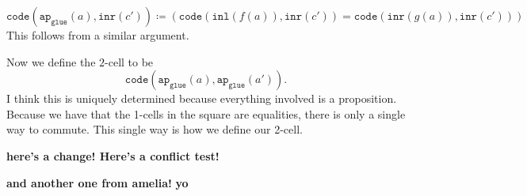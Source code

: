 \documentclass[11pt]{amsart}
\newcommand{\type}[1]{\mathtt{#1}}
\begin{document}
\vspace{2em}

$ 
\type{ code } \left( \type{ ap }_{ \type{ glue } } ( a ) , \type{ inr } ( c' ) \right) \coloneqq 
	\left( 
		\type{ code } ( \type{ inl } ( f ( a ) ) , \type{ inr } ( c' ) ) =
		\type{ code } ( \type{ inr } ( g ( a ) ) , \type{ inr } ( c' ) ) 
	\right) 
$ 
This follows from a similar argument.

\vspace{2em}

Now we define the $2$-cell to be
\[
	\type{ code } ( \type{ ap }_\type{ glue } ( a ) , \type{ ap }_\type{ glue } ( a' )  ) .
\]
I think this is uniquely determined because
everything involved is a proposition. 
Because we have that the 1-cells 
in the square are equalities,
there is only a single way to commute.
This single way is how we define our 2-cell. 

\textbf{here's a change! Here's a conflict test!}

\textbf{and another one from amelia!}
\textbf{yo}


\end{document}
